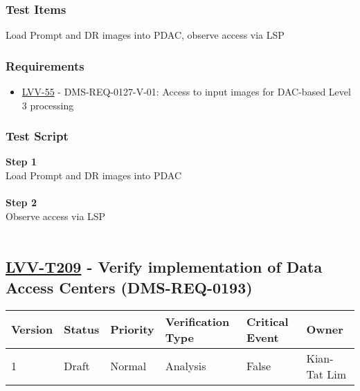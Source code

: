 \hypertarget{test-items-184}{%
\subsubsection{Test Items}\label{test-items-184}}

Load Prompt and DR images into PDAC, observe access via LSP

\hypertarget{requirements-185}{%
\subsubsection{Requirements}\label{requirements-185}}

\begin{itemize}
\tightlist
\item
  \href{https://jira.lsstcorp.org/browse/LVV-55}{LVV-55} -
  DMS-REQ-0127-V-01: Access to input images for DAC-based Level 3
  processing
\end{itemize}

\hypertarget{test-script-185}{%
\subsubsection{Test Script}\label{test-script-185}}

\textbf{Step 1}\\
Load Prompt and DR images into PDAC\\
~\\
\textbf{Step 2}\\
Observe access via LSP\\
~\\

\hypertarget{lvv-t209---verify-implementation-of-data-access-centers-dms-req-0193}{%
\subsection{\texorpdfstring{\href{https://jira.lsstcorp.org/secure/Tests.jspa\#/testCase/LVV-T209}{LVV-T209}
- Verify implementation of Data Access Centers
(DMS-REQ-0193)}{LVV-T209 - Verify implementation of Data Access Centers (DMS-REQ-0193)}}\label{lvv-t209---verify-implementation-of-data-access-centers-dms-req-0193}}

\begin{longtable}[]{@{}llllll@{}}
\toprule
Version & Status & Priority & Verification Type & Critical Event &
Owner\tabularnewline
\midrule
\endhead
1 & Draft & Normal & Analysis & False & Kian-Tat Lim\tabularnewline
\bottomrule
\end{longtable}

